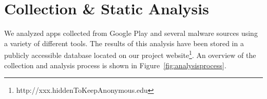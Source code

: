 \documentclass{sig-alternate-05-2015}
\newif\ifisnopii
\begin{document}



\section{Collection \& Static Analysis}
\label{sec: csa}

We analyzed apps collected from Google Play and several malware sources using a variety of different tools. The results of this analysis have been stored in a publicly accessible database located on our project website\footnote{\ifisnopii http://darwin.rit.edu \else http://xxx.hiddenToKeepAnonymous.edu \fi}. An overview of the collection and analysis process is shown in Figure~\ref{fig:analysisprocess}.
\end{document}
